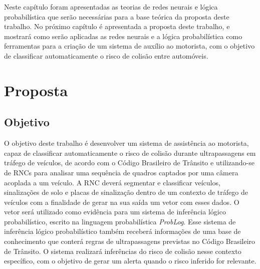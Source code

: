 \documentclass[
	12pt,				%
    oneside,			%
	a4paper,			%
	english,			%
	french,				%
	spanish,			%
	brazil,				%
	]{abntex2}
\begin{document}
Neste capítulo foram apresentadas as teorias de redes neurais e lógica probabilística que serão necessárias para a base teórica da proposta deste trabalho. No próximo capítulo é apresentada a proposta deste trabalho, e mostrará como serão aplicadas as redes neurais e a lógica probabilística como ferramentas para a criação de um sistema de auxílio ao motorista, com o objetivo de classificar automaticamente o risco de colisão entre automóveis.










\chapter {Proposta}

\section {Objetivo}
O objetivo deste trabalho é desenvolver um sistema de assistência ao motorista, capaz de classificar automaticamente o risco de colisão durante ultrapassagens em tráfego de veículos, de acordo com o Código Brasileiro de Trânsito e utilizando-se de RNCs para analisar uma sequência de quadros captados por uma câmera acoplada a um veículo. A RNC deverá segmentar e classificar veículos, sinalizações de solo e placas de sinalização dentro de um contexto de tráfego de veículos com a finalidade de gerar na sua saída um vetor com esses dados. O vetor será utilizado como evidência para um sistema de inferência lógico probabilístico, escrito na linguagem probabilística \textit{ProbLog}. Esse sistema de inferência lógico probabilístico também receberá informações de uma base de conhecimento que conterá regras de ultrapassagens previstas no Código Brasileiro de Trânsito. O sistema realizará inferências do risco de colisão nesse contexto específico, com o objetivo de gerar um alerta quando o risco inferido for relevante.
\end{document}
